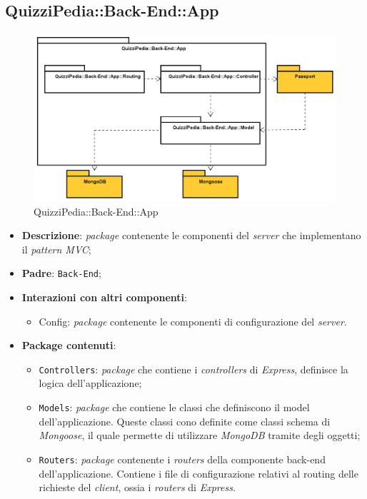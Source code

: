 \newpage
\subsection{QuizziPedia::Back-End::App}

\label{QuizziPedia::Back-End::App}
\begin{figure}[ht]
	\centering
	\includegraphics[scale=0.5]{UML/Package/QuizziPedia_Back-End_App.png}
	\caption{QuizziPedia::Back-End::App}
\end{figure}
\FloatBarrier

	\begin{itemize}
		\item \textbf{Descrizione}:
		\textit{package} contenente le componenti del \textit{server} che implementano il \textit{pattern\ped{G} MVC};
		\item \textbf{Padre}: \texttt{Back-End};
		\item \textbf{Interazioni con altri componenti}:
			\begin{itemize}
				\item Config:
				\textit{package} contenente le componenti di configurazione del \textit{server}.
			\end{itemize}
		\item \textbf{Package contenuti}:
			\begin{itemize}
				\item \texttt{Controllers}:
				\textit{package} che contiene i \textit{controllers}  di \textit{Express}, definisce la logica dell'applicazione;
				\item \texttt{Models}:
				\textit{package} che contiene le classi che definiscono il model dell'applicazione. Queste classi cono definite come classi schema di \textit{Mongoose}, il quale permette di utilizzare \textit{MongoDB} tramite degli oggetti;
				\item \texttt{Routers}:
				\textit{package} contenente i \textit{routers} della componente back-end dell'applicazione. Contiene i file di configurazione relativi al routing delle richieste del \textit{client}, ossia i \textit{routers} di \textit{Express}.
			\end{itemize}
	\end{itemize}
	
	
	
	